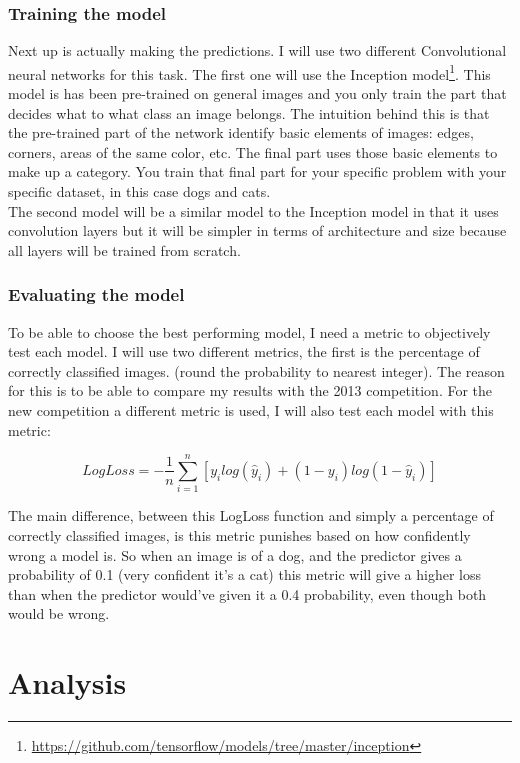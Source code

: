 \documentclass[11pt]{article}
\begin{document}
\subsubsection{Training the model}
Next up is actually making the predictions. I will use two different Convolutional neural networks for this task. The first one will use the Inception model\footnote{\url{https://github.com/tensorflow/models/tree/master/inception}}. This model is has been pre-trained on general images and you only train the part that decides what to what class an image belongs. The intuition behind this is that the pre-trained part of the network identify basic elements of images: edges, corners, areas of the same color, etc. The final part uses those basic elements to make up a category. You train that final part for your specific problem with your specific dataset, in this case dogs and cats.\\

The second model will be a similar model to the Inception model in that it uses convolution layers but it will be simpler in terms of architecture and size because all layers will be trained from scratch.
\subsubsection{Evaluating the model}
\label{evaluation-metric}
To be able to choose the best performing model, I need a metric to objectively test each model. I will use two different metrics, the first is the percentage of correctly classified images. (round the probability to nearest integer). The reason for this is to be able to compare my results with the 2013 competition. For the new competition a different metric is used, I will also test each model with this metric: 

\[
LogLoss = -\dfrac{1}{n}\sum\limits^{n}_{i=1}[y_i log(\hat{y}_i) + (1-y_i)log(1-\hat{y}_i)]
\]

The main difference, between this LogLoss function and simply a percentage of correctly classified images, is this metric punishes based on how confidently wrong a model is. So when an image is of a dog, and the predictor gives a probability of 0.1 (very confident it's a cat) this metric will give a higher loss than when the predictor would've given it a 0.4 probability, even though both would be wrong.
\pagebreak[4]
\section{Analysis}
\end{document}
